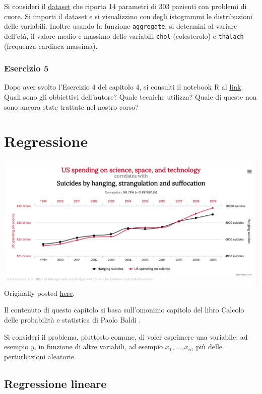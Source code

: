 \documentclass[]{book}
\begin{document}
Si consideri il \href{https://www.kaggle.com/ronitf/heart-disease-uci}{dataset} che riporta 14 parametri di 303 pazienti con problemi di cuore. Si importi il dataset e si visualizzino con degli istogrammi le distribuzioni delle variabili. Inoltre usando la funzione \texttt{aggregate}, si determini al variare dell'età, il valore medio e massimo delle variabili \texttt{chol} (colesterolo) e \texttt{thalach} (frequenza cardiaca massima).

\hypertarget{esercizio-5}{%
\subsection{Esercizio 5}\label{esercizio-5}}

Dopo aver svolto l'Esercizio 4 del capitolo 4, si consulti il notebook R al \href{https://www.kaggle.com/naik170106027/prediction-of-heart-diseases}{link}. Quali sono gli obbiettivi dell'autore? Quale tecniche utilizza? Quale di queste non sono ancora state trattate nel nostro corso?

\hypertarget{regressione}{%
\chapter{Regressione}\label{regressione}}

\includegraphics{./media/spurCorr.png}
Originally posted \href{http://www.tylervigen.com/spurious-correlations}{here}.

Il contenuto di questo capitolo si basa sull'omonimo capitolo del libro Calcolo delle probabilità e statistica di Paolo Baldi \citep{Baldi1998}.

Si consideri il problema, piuttosto comune, di voler esprimere una variabile, ad esempio \(y\), in funzione di altre variabili, ad esempio \(x_1, \dots , x_n\), più delle perturbazioni aleatorie.

\hypertarget{regressione-lineare}{%
\section{Regressione lineare}\label{regressione-lineare}}
\end{document}
